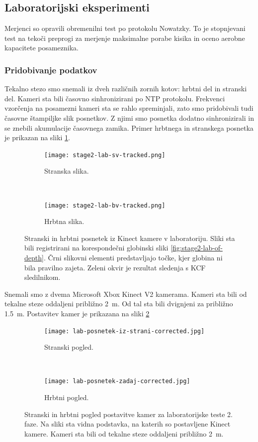 \subsection{Laboratorijski eksperimenti}
Merjenci so opravili obremenilni test po protokolu Nowatzky. To je stopnjevani test na tekoči preprogi za merjenje maksimalne porabe kisika in oceno aerobne kapacitete posameznika.

\subsubsection{Pridobivanje podatkov}
Tekalno stezo smo snemali iz dveh različnih zornih kotov: hrbtni del in stranski del. Kameri sta bili časovno sinhronizirani po NTP protokolu. Frekvenci vzorčenja na posamezni kameri sta se rahlo spreminjali, zato smo pridobivali tudi časovne štampiljke slik posnetkov. Z njimi smo posnetka dodatno sinhronizirali in se znebili akumulacije časovnega zamika.  Primer hrbtnega in stranskega posnetka je prikazan na sliki \ref{fig:primer-posnetka-stage2}.

\begin{figure}[!htb]
	\centering
	\begin{subfigure}{0.45\columnwidth}
		\texttt{[image: stage2-lab-sv-tracked.png]}
		\caption{Stranska slika.}
	\end{subfigure}
	~
	\begin{subfigure}{0.45\columnwidth}
		\texttt{[image: stage2-lab-bv-tracked.png]}
		\caption{Hrbtna slika.}
	\end{subfigure}
	\caption[Stranski in hrbtni posnetek iz Kinect kamere v laboratoriju]{Stranski in hrbtni posnetek iz Kinect kamere v laboratoriju. Sliki sta bili registrirani na korespondečni globinski sliki \ref{fig:stage2-lab-of-depth}. Črni slikovni elementi predstavljajo točke, kjer globina ni bila pravilno zajeta. Zeleni okvir je rezultat sledenja s KCF sledilnikom.}
	\label{fig:primer-posnetka-stage2}
\end{figure}

Snemali smo z dvema Microsoft Xbox Kinect V2 kamerama. Kameri sta bili od tekalne steze oddaljeni približno \SI{2}{m}. Od tal sta bili dvignjeni za približno \SI{1.5}{m}. Postavitev kamer je prikazana na sliki \ref{fig:lab-postavitev-kamer}

\begin{figure}[!htb]
	\centering
	\begin{subfigure}[t]{0.45\columnwidth}
		\texttt{[image: lab-posnetek-iz-strani-corrected.jpg]}
		\caption{Stranski pogled.}
	\end{subfigure}
	~
	\begin{subfigure}[t]{0.45\columnwidth}
		\texttt{[image: lab-posnetek-zadaj-corrected.jpg]}
		\caption{Hrbtni pogled.}
	\end{subfigure}
	\caption[Stranski in hrbtni pogled postavitve kamer za laboratorijske teste 2. faze]{Stranski in hrbtni pogled postavitve kamer za laboratorijske teste 2. faze. Na sliki sta vidna podstavka, na katerih so postavljene Kinect kamere. Kameri sta bili od tekalne steze oddaljeni približno \SI{2}{m}.}
	\label{fig:lab-postavitev-kamer}
\end{figure}


